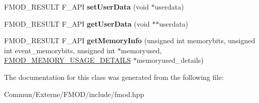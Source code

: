 \begin{DoxyCompactItemize}
\item 
F\+M\+O\+D\+\_\+\+R\+E\+S\+U\+LT F\+\_\+\+A\+PI {\bfseries set\+User\+Data} (void $\ast$userdata)\hypertarget{class_f_m_o_d_1_1_channel_a1ffb34925720c2fcc0afbcab0737df4e}{}\label{class_f_m_o_d_1_1_channel_a1ffb34925720c2fcc0afbcab0737df4e}

\item 
F\+M\+O\+D\+\_\+\+R\+E\+S\+U\+LT F\+\_\+\+A\+PI {\bfseries get\+User\+Data} (void $\ast$$\ast$userdata)\hypertarget{class_f_m_o_d_1_1_channel_ab22d259b47802604e61c0e412d7e35f4}{}\label{class_f_m_o_d_1_1_channel_ab22d259b47802604e61c0e412d7e35f4}

\item 
F\+M\+O\+D\+\_\+\+R\+E\+S\+U\+LT F\+\_\+\+A\+PI {\bfseries get\+Memory\+Info} (unsigned int memorybits, unsigned int event\+\_\+memorybits, unsigned int $\ast$memoryused, \hyperlink{struct_f_m_o_d___m_e_m_o_r_y___u_s_a_g_e___d_e_t_a_i_l_s}{F\+M\+O\+D\+\_\+\+M\+E\+M\+O\+R\+Y\+\_\+\+U\+S\+A\+G\+E\+\_\+\+D\+E\+T\+A\+I\+LS} $\ast$memoryused\+\_\+details)\hypertarget{class_f_m_o_d_1_1_channel_acefe95cb3e5096a5f01f253c2745bad3}{}\label{class_f_m_o_d_1_1_channel_acefe95cb3e5096a5f01f253c2745bad3}

\end{DoxyCompactItemize}


The documentation for this class was generated from the following file\+:\begin{DoxyCompactItemize}
\item 
Commun/\+Externe/\+F\+M\+O\+D/include/fmod.\+hpp\end{DoxyCompactItemize}
